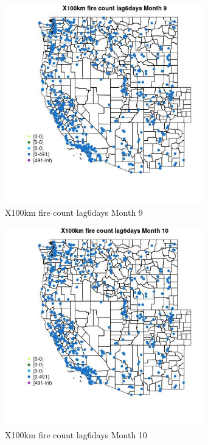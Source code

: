 \begin{figure} 
\centering  
\includegraphics[width=0.77\textwidth]{Code_Outputs/Report_ML_input_PM25_Step4_part_e_de_duplicated_aves_compiled_2019-05-14wNAs_MapObsMo9X100km_fire_count_lag6days.jpg} 
\caption{\label{fig:Report_ML_input_PM25_Step4_part_e_de_duplicated_aves_compiled_2019-05-14wNAsMapObsMo9X100km_fire_count_lag6days}X100km fire count lag6days Month 9} 
\end{figure} 
 

\begin{figure} 
\centering  
\includegraphics[width=0.77\textwidth]{Code_Outputs/Report_ML_input_PM25_Step4_part_e_de_duplicated_aves_compiled_2019-05-14wNAs_MapObsMo10X100km_fire_count_lag6days.jpg} 
\caption{\label{fig:Report_ML_input_PM25_Step4_part_e_de_duplicated_aves_compiled_2019-05-14wNAsMapObsMo10X100km_fire_count_lag6days}X100km fire count lag6days Month 10} 
\end{figure} 
 

